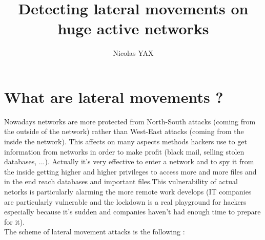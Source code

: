 \documentclass[11pt]{article}
\title{\textbf{Detecting lateral movements on huge active networks}}
\author{Nicolas YAX}
\date{}
\begin{document}
\maketitle


\section{What are lateral movements ?}

Nowadays networks are more protected from North-South attacks (coming from the outside of the network) rather than West-East attacks (coming from the inside the network). This affects on many aspects methods hackers use to get information from networks in order to make profit (black mail, selling stolen databases, ...). Actually it's very effective to enter a network and to spy it from the inside getting higher and higher privileges to access more and more files and in the end reach databases and important files.This vulnerability of actual netorks is particularly alarming the more remote work develops (IT companies are particularly vulnerable and the lockdown is a real playground for hackers especially because it's sudden and companies haven't had enough time to prepare for it). \\
The scheme of lateral movement attacks is the following : 
\end{document}
